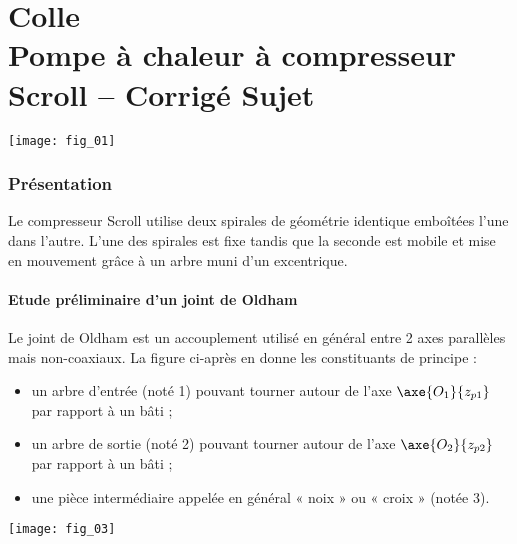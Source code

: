 \chapter*{Colle  \\ 
Pompe à chaleur à compresseur Scroll -- 
\ifprof Corrigé \else Sujet \fi}

\iflivret {} \else
\ifprof  {} \else \fi
\fi

\setcounter{question}{0}

\begin{marginfigure}[4cm]
\centering
\texttt{[image: fig\_01]}
\end{marginfigure}


\subsection*{Présentation}
Le compresseur Scroll utilise deux spirales de géométrie identique emboîtées l’une dans 
l’autre. L’une des spirales est fixe tandis que la seconde est mobile et mise 
en mouvement grâce à un arbre muni d’un excentrique. 



\subsubsection*{Etude préliminaire d'un joint de Oldham}


Le joint de Oldham est un accouplement utilisé en général entre 2 axes parallèles mais non-coaxiaux. La figure ci-après en donne les constituants de principe :
\begin{itemize}
\item un arbre d’entrée (noté 1) pouvant tourner autour de l’axe $\axe{O_1}{z_{p1}}$ par rapport à un bâti ;
\item un arbre de sortie (noté 2) pouvant tourner autour de l’axe $\axe{O_2}{z_{p2}}$ par rapport à un bâti ;
\item une pièce intermédiaire appelée en général « noix » ou « croix » (notée 3).
\end{itemize}

\begin{center}%
\texttt{[image: fig\_03]}
\end{center}

